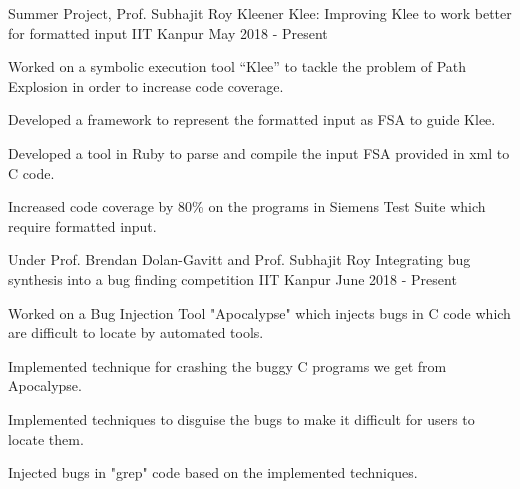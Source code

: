 

\begin{cventries}

  \cventry
    {Summer Project, Prof. Subhajit Roy} %
    {Kleener Klee: Improving Klee to work better for formatted input} %
    {IIT Kanpur} %
    {May 2018 - Present} %
    {
      \begin{cvitems} %
      \item {Worked on a symbolic execution tool “Klee” to tackle the problem of Path Explosion in order to increase code coverage.}
        \item {Developed a framework to represent the formatted input as FSA to guide Klee.} 
        \item {Developed a tool in Ruby to parse and compile the input FSA provided in xml to C code.}
        \item {Increased code coverage by 80\% on the programs in Siemens Test Suite which require formatted input.}
      \end{cvitems}
    }



  \cventry
    {Under Prof. Brendan Dolan-Gavitt and Prof. Subhajit Roy} %
    {Integrating bug synthesis into a bug finding competition} %
    {IIT Kanpur} %
    {June 2018 - Present} %
    {
      \begin{cvitems} %
        \item {Worked on a Bug Injection Tool "Apocalypse" which injects bugs in C code which are difficult to locate by automated tools.}
        \item {Implemented technique for crashing the buggy C programs we get from Apocalypse.}
        \item {Implemented techniques to disguise the bugs to make it difficult for users to locate them.}
        \item {Injected bugs in "grep" code based on the implemented techniques.}
      \end{cvitems}
    }


\end{cventries}
